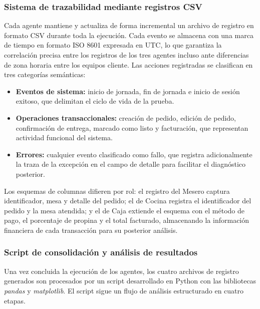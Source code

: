 \subsubsection*{Sistema de trazabilidad mediante registros CSV}

Cada agente mantiene y actualiza de forma incremental un archivo de registro en formato CSV durante toda la ejecución. Cada evento se almacena con una marca de tiempo en formato ISO 8601 expresada en UTC, lo que garantiza la correlación precisa entre los registros de los tres agentes incluso ante diferencias de zona horaria entre los equipos cliente. Las acciones registradas se clasifican en tres categorías semánticas:

\begin{itemize}
	\item \textbf{Eventos de sistema:} inicio de jornada, fin de jornada e inicio de sesión exitoso, que delimitan el ciclo de vida de la prueba.
	\item \textbf{Operaciones transaccionales:} creación de pedido, edición de pedido, confirmación de entrega, marcado como listo y facturación, que representan actividad funcional del sistema.
	\item \textbf{Errores:} cualquier evento clasificado como fallo, que registra adicionalmente la traza de la excepción en el campo de detalle para facilitar el diagnóstico posterior.
\end{itemize}

Los esquemas de columnas difieren por rol: el registro del Mesero captura identificador, mesa y detalle del pedido; el de Cocina registra el identificador del pedido y la mesa atendida; y el de Caja extiende el esquema con el método de pago, el porcentaje de propina y el total facturado, almacenando la información financiera de cada transacción para su posterior análisis.

\subsubsection*{Script de consolidación y análisis de resultados}

Una vez concluida la ejecución de los agentes, los cuatro archivos de registro generados son procesados por un script desarrollado en Python con las bibliotecas \textit{pandas} y \textit{matplotlib}. El script sigue un flujo de análisis estructurado en cuatro etapas.

